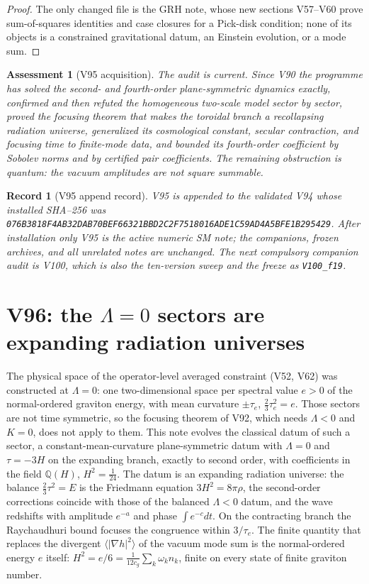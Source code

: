 \documentclass[11pt]{article}
\newtheorem{assessment}[theorem]{Assessment}
\newtheorem{record}[theorem]{Record}
\theoremstyle{remark}
\begin{document}
\begin{proof}
The only changed file is the GRH note, whose new sections
V57--V60 prove sum-of-squares identities and case closures for a
Pick-disk condition; none of its objects is a constrained
gravitational datum, an Einstein evolution, or a mode sum.
\end{proof}

\begin{assessment}[V95 acquisition]
\label{ass:v19v95}
The audit is current.  Since V90 the programme has solved the
second- and fourth-order plane-symmetric dynamics exactly, confirmed
and then refuted the homogeneous two-scale model sector by sector,
proved the focusing theorem that makes the toroidal branch a
recollapsing radiation universe, generalized its cosmological
constant, secular contraction, and focusing time to finite-mode
data, and bounded its fourth-order coefficient by Sobolev norms and
by certified pair coefficients.  The remaining obstruction is
quantum: the vacuum amplitudes are not square summable.
\end{assessment}

\begin{record}[V95 append record]
\label{rec:v19v95}
V95 is appended to the validated V94 whose installed SHA--256 was
\texttt{076B3818F4AB32DAB70BEF66321BBD2C2F7518016ADE1C59AD4A5BFE1B295429}.
After installation only V95 is the active numeric SM note; the
companions, frozen archives, and all unrelated notes are unchanged.  The
next compulsory companion audit is V100, which is also the
ten-version sweep and the freeze as \texttt{V100\_f19}.
\end{record}


\section{V96: the \texorpdfstring{$\Lambda=0$}{Lambda = 0} sectors are expanding radiation universes}
\label{sec:v19v96}

The physical space of the operator-level averaged constraint (V52,
V62) was constructed at \(\Lambda=0\): one two-dimensional space per
spectral value \(e>0\) of the normal-ordered graviton energy, with
mean curvature \(\pm\tau_e\), \(\tfrac23\tau_e^2=e\).  Those sectors
are not time symmetric, so the focusing theorem of V92, which needs
\(\Lambda<0\) and \(K=0\), does not apply to them.  This note
evolves the classical datum of such a sector, a constant-mean-curvature
plane-symmetric datum with \(\Lambda=0\) and \(\tau=-3H\) on the
expanding branch, exactly to second order, with coefficients in the
field \(\mathbb Q(H)\), \(H^2=\tfrac1{24}\).  The datum is an
expanding radiation universe: the balance \(\tfrac23\tau^2=E\) is
the Friedmann equation \(3H^2=8\pi\rho\), the second-order
corrections coincide with those of the balanced \(\Lambda<0\) datum,
and the wave redshifts with amplitude \(e^{-a}\) and phase
\(\int e^{-c}dt\).  On the contracting branch the Raychaudhuri bound
focuses the congruence within \(3/\tau_e\).  The finite quantity that
replaces the divergent \(\langle|\nabla h|^2\rangle\) of the vacuum
mode sum is the normal-ordered energy \(e\) itself:
\(H^2=e/6=\tfrac1{12c_g}\sum_k\omega_kn_k\), finite on every state
of finite graviton number.
\end{document}

